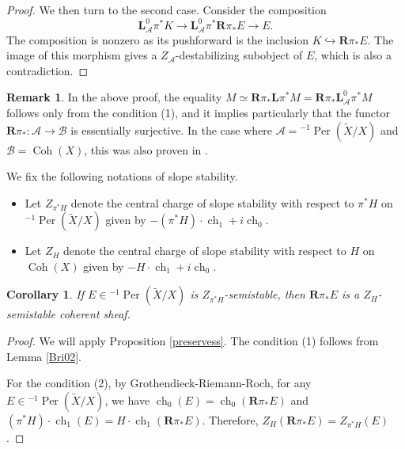\documentclass[12pt]{amsart}
\newtheorem{corollary}[theorem]{Corollary}
\theoremstyle{definition}
\newtheorem{remark}[theorem]{Remark}
\DeclareMathOperator{\Coh}{Coh}
\DeclareMathOperator{\ch}{ch}
\DeclareMathOperator{\Per}{Per}
\begin{document}
\begin{proof}
We then turn to the second case.
Consider the composition $$\mathbf{L}^0_{\mathcal{A}}\pi^\ast K \longrightarrow \mathbf{L}^0_{\mathcal{A}}\pi^\ast \mathbf{R}\pi_\ast E \longrightarrow E.$$
The composition is nonzero as its pushforward is the inclusion $K \hookrightarrow \mathbf{R}\pi_\ast E$.
The image of this morphism gives a $Z_\mathcal{A}$-destabilizing subobject of $E$, which is also a contradiction.
\end{proof}

\begin{remark}\label{2}
In the above proof, the equality 
$M \simeq \mathbf{R}\pi_\ast \mathbf{L}\pi^\ast M = \mathbf{R}\pi_\ast \mathbf{L}^0_{\mathcal{A}} \pi^\ast M$ follows only from the condition (1),
and it implies particularly that the functor $\mathbf{R}\pi_\ast \colon \mathcal{A}  \longrightarrow \mathcal{B}$ is essentially surjective.
In the case where $\mathcal{A}={^{-1}\Per(\widetilde{X}/X)}$ and $\mathcal{B} =\Coh(X)$, this was also proven in \cite[Theorem 2.14]{BKS18}.
\end{remark}


We fix the following notations of slope stability.
\begin{itemize}
\item Let $Z_{\pi^\ast H}$ denote the central charge of slope stability with respect to $\pi^\ast H$ on ${^{-1}\Per(\widetilde{X}/X)}$ given by $-(\pi^\ast H)\cdot \ch_1+i\ch_0$.
\item Let $Z_H$ denote the central charge of slope stability with respect to $H$ on $\Coh(X)$ given by $-H\cdot \ch_1+i\ch_0$.

\end{itemize}

\begin{corollary}\label{3}
If $E \in  {^{-1}\Per(\widetilde{X}/X)}$ is $Z_{\pi^\ast H}$-semistable,
then $\mathbf{R}\pi_\ast E$ is a $Z_H$-semistable coherent sheaf.
\end{corollary}

\begin{proof}
We will apply Proposition \ref{preservess}.
The condition (1) follows from Lemma \ref{Bri02}.

For the condition (2), by  Grothendieck-Riemann-Roch,
for any $E \in {^{-1}\Per(\widetilde{X}/X)}$,
we have $\ch_0(E)=\ch_0(\mathbf{R}\pi_\ast E)$ and $(\pi^\ast H) \cdot \ch_1(E) = H \cdot \ch_1(\mathbf{R}\pi_\ast E)$.
Therefore, $Z_H(\mathbf{R}\pi_\ast E) = Z_{\pi^\ast H}(E)$. 
\end{proof}
\end{document}
